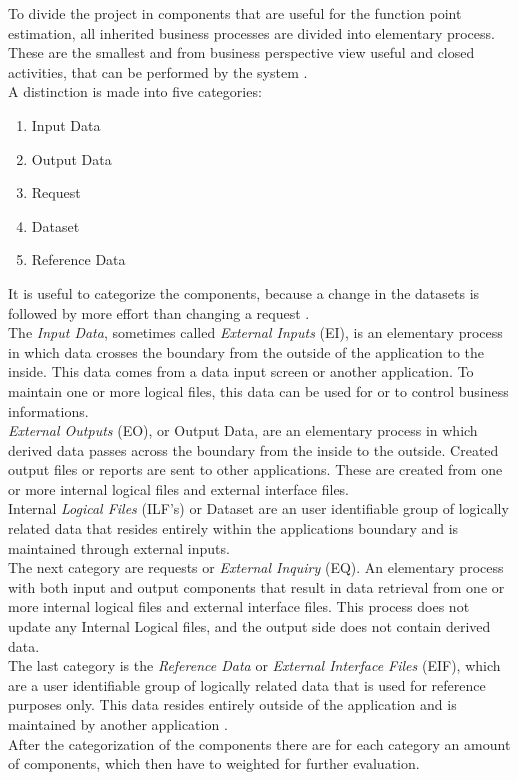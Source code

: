 To divide the project in components that are useful for the function point estimation, all inherited business processes are divided into elementary process. These are the smallest and from business perspective view useful and closed activities, that can be performed by the system \cite{FPKompakt}. \\
A distinction is made into five categories:
\begin{enumerate}
	\item Input Data
	\item Output Data
	\item Request
	\item Dataset
	\item Reference Data
\end{enumerate}
It is useful to categorize the components, because a change in the datasets is followed by more effort than changing a request \cite{itplanung}.\\
The \textit{Input Data}, sometimes called \textit{External Inputs} (EI), is an elementary process in which data crosses the boundary from the outside of the application to the inside. This data comes from a data input screen or another application. To maintain one or more logical files, this data can be used for or to control business informations.\\
\textit{External Outputs} (EO), or Output Data, are an elementary process in which derived data passes across the boundary from the inside to the outside. Created output files or reports are sent to other applications. These are created from one or more internal logical files and external interface files.\\
Internal \textit{Logical Files} (ILF’s) or Dataset are an user identifiable group of logically related data that resides entirely within the applications boundary and is maintained through external inputs.\\
The next category are requests or \textit{External Inquiry} (EQ). An elementary process with both input and output components that result in data retrieval from one or more internal logical files and external interface files. This process does not update any Internal Logical files, and the output side does not contain derived data.\\
The last category is the \textit{Reference Data} or \textit{External Interface Files} (EIF), which are a user identifiable group of logically related data that is used for reference purposes only. This data resides entirely outside of the application and is maintained by another application \cite{fpafundamentals}.\\
After the categorization of the components there are for each category an amount of components, which then have to weighted for further evaluation.


